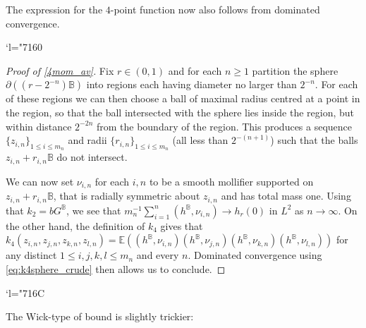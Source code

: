\documentclass[JEP,XML,SOM,Unicode,published]{cedram}
\newcommand{\Changel}{\mathcode`l="7160}
\newcommand{\Changelback}{\mathcode`l="716C}
\theoremstyle{definition}
\newcommand{\E}{\mathbb{E}}
\newcommand{\B}{\mathbb{B}}\let\D\B\let\Ub\B
\begin{document}
The expression for the $4$-point function now also follows from dominated convergence.

\Changel
\begin{proof}[Proof of \eqref{4mom_av}]
Fix $r\in (0,1)$ and for each $n\ge 1$ partition the sphere $\partial((r-2^{-n})\B)$ into regions each having diameter no larger than $2^{-n}$. For each of these regions we can then choose a ball of maximal radius centred at a point in the region, so that the ball intersected with the sphere lies inside the region, but within distance $2^{-2n}$ from the boundary of the region. This produces a sequence $\{z_{i,n}\}_{1\le i\le m_n}$ and radii $
\{r_{i,n}\}_{1\le i \le m_n}$ (all less than $2^{-(n+1)}$) such that the balls $z_{i,n}+r_{i,n}\B$ do not intersect.

We can now set $\nu_{i,n}$ for each $i,n$ to be a smooth mollifier supported on $z_{i,n}+r_{i,n}\B$, that is radially symmetric about $z_{i,n}$ and has total mass one. Using that $k_2=bG^\B$, we see that $m_n^{-1}\sum_{i=1}^n (h^\B,\nu_{i,n})\to h_r(0)$ in $L^2$ as $n\to \infty$. On the other hand, the definition of $k_4$ gives that $k_4(z_{i,n},z_{j,n},z_{k,n},z_{l,n})=\E((h^\B,\nu_{i,n})(h^\B,\nu_{j,n})(h^\B,\nu_{k,n})(h^\B,\nu_{l,n}))$ for any distinct $1\le i,j,k,l\le m_n$ and every $n$. Dominated convergence using \eqref{eq:k4sphere_crude} then allows us to conclude.
\end{proof}
\Changelback

The Wick-type of bound is slightly trickier:
\end{document}
